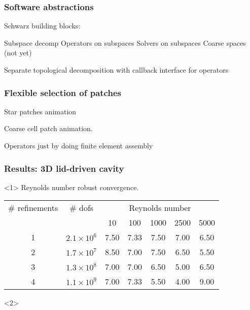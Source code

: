 \documentclass[presentation]{beamer}
\begin{document}
\begin{frame}
  \frametitle{Software abstractions}
  Schwarz building blocks:

  Subspace decomp
  Operators on subspaces
  Solvers on subspaces
  Coarse spaces (not yet)

  Separate topological decomposition with callback interface for operators
\end{frame}
\begin{frame}
  \frametitle{Flexible selection of patches}
  Star patches animation

  Coarse cell patch animation.

  Operators just by doing finite element assembly
\end{frame}
\begin{frame}
  \frametitle{Results: 3D lid-driven cavity}
  \begin{onlyenv}<1>
    Reynolds number robust convergence.
    \begin{center}
      \begin{tabular}{cc|ccccc}
        \toprule
        \# refinements & \# dofs & \multicolumn{5}{c}{Reynolds number} \\
                       && 10 & 100 & 1000 & 2500 & 5000 \\
        \midrule
        1 & $2.1 \times 10^6$ & 7.50 & 7.33 & 7.50 & 7.00 & 6.50 \\
        2 & $1.7 \times 10^7$ & 8.50 & 7.00 & 7.50 & 6.50 & 5.50 \\
        3 & $1.3 \times 10^8$ & 7.00 & 7.00 & 6.50 & 5.00 & 6.50 \\
        4 & $1.1 \times 10^9$ & 7.00 & 7.33 & 5.50 & 4.00 & 9.00 \\
        \bottomrule
      \end{tabular}
    \end{center}
  \end{onlyenv}
  \begin{onlyenv}<2>
    

\end{onlyenv}
\end{frame}
\end{document}

